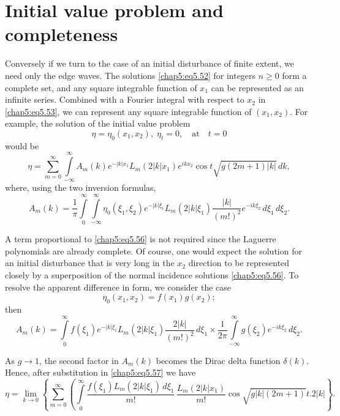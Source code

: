 \section{Initial value problem and completeness}\label{chap5:sec5.7}\pageoriginale

Conversely if we turn to the case of an initial disturbance of finite extent, we need only the edge waves. The solutions \eqref{chap5:eq5.52} for integers $n\geq 0$ form a complete set, and any square integrable function of $x_1$ can be represented as an infinite series. Combined with a Fourier integral with respect to $x_2$ in \eqref{chap5:eq5.53}, we can represent any square integrable function of $(x_1,x_2)$. For example, the solution of the initial value problem
$$
\eta=\eta_0\left(x_1,x_2\right),\;\eta_t=0,\quad\text{at}\quad t=0
$$
would be 
\begin{equation}
\eta=\sum\limits_{m=0}^\infty\int\limits_{-\infty}^\infty A_m(k)e^{-|k|x_1}L_m\left(2 |k|x_1\right)e^{ikx_2}\cos t\sqrt{g(2m+1)|k|}\,dk,\tag{5.57}\label{chap5:eq5.57}
\end{equation}
where, using the two inversion formulas,
\begin{equation}
A_m(k)=\frac{1}{\pi}\int\limits_0^\infty \int\limits_{-\infty}^\infty\eta_0\left( \xi_1,\xi_2\right)e^{-|k|\xi_1}L_m\left(2|k|\xi_1\right)\frac{|k|}{(m!)^2} e^{-ik\xi_2}\,d\xi_1\,d\xi_2.\tag{5.58}\label{chap5:eq5.58}
\end{equation}

A term proportional to \eqref{chap5:eq5.56} is not required since the Laguerre polynomials are already complete. Of course, one would expect the solution for an initial disturbance that is very long in the $x_2$ direction to be represented closely by a superposition of the normal incidence solutions \eqref{chap5:eq5.56}. To resolve the apparent difference in form, we consider the case
$$
\eta_0\left(x_1,x_2\right)=f(x_1)g(x_2);
$$
then
$$
A_m(k)=\int\limits_0^\infty f(\xi_1)e^{-|k|\xi_1}L_m\left(2|k|\xi_1\right) \frac{2|k|}{(m!)^2}\,d\xi_1\times\frac{1}{2\pi}\int\limits_{-\infty}^\infty g(\xi_2)e^{-ik\xi_2}\,d\xi_2.
$$\pageoriginale

As $g\to 1$, the second factor in $A_m(k)$ becomes the Dirac delta function $\delta(k)$. Hence, after substitution in \eqref{chap5:eq5.57} we have 
{\fontsize{10}{12}\selectfont
$$
\eta=\underset{k\to 0}{\lim}\left\{\sum\limits_{m=0}^\infty
\left(\int\limits_0^\infty\frac{f(\xi_1)L_m\left(2|k|\xi_1\right)\,d\xi_1}{m!}
\,\frac{L_m\left(2|k|x_1\right)}{m!}\cos\sqrt{g|k|(2m+1)}t.2|k|\right.\right\}. 
$$} 

